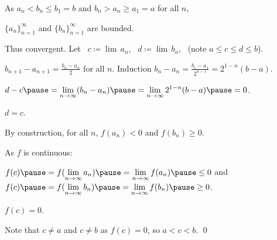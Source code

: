 \documentclass[10pt,aspectratio=149]{beamer}
\begin{document}
\begin{frame}
As $a_n < b_n \leq b_1 = b$ and 
$b_n > a_n \geq a_1 = a$ for all $n$,

\pause
$\{a_n\}_{n=1}^\infty$ and $\{ b_n \}_{n=1}^\infty$ are bounded.

\pause
\medskip

Thus convergent. Let ~$c \coloneqq \lim\, a_n$,~ $d \coloneqq \lim\, b_n$,
~(note $a \leq c \leq d \leq b$).

\pause
\medskip

$b_{n+1} - a_{n+1} = \frac{b_n-a_n}{2}$ for all $n$.
\pause
\qquad 
Induction \wthus
$b_n - a_n
= \frac{b_1-a_1}{2^{n-1}}
= 2^{1-n} (b-a)$.

\pause
\medskip

$\displaystyle
d-c
\pause
= \lim_{n\to\infty} (b_n - a_n)
\pause
=
\lim_{n\to\infty} 2^{1-n} (b-a)
\pause
= 0$.

\pause
\medskip

\thus \quad $d=c$.

\pause
\medskip

By construction, for all $n$, \quad
$f(a_n) < 0$ \quad and \quad $f(b_n) \geq 0$.

\pause
\medskip

As $f$ is continuous:

\medskip

$f(c)
\pause
=
f(\lim\limits_{n\to\infty} a_n)
\pause
=
\lim\limits_{n\to\infty} f(a_n)
\pause
\leq 0$
\pause
\qquad and \qquad
$f(c)
\pause
=
f(\lim\limits_{n\to\infty} b_n)
\pause
=
\lim\limits_{n\to\infty} f(b_n)
\pause
\geq 0$.

\pause
\medskip

\thus \quad $f(c) = 0$.

\pause
\medskip

Note that $c \not=a$ and $c \not= b$ as $f(c)=0$, \quad so $a < c < b$.  \qed
\end{frame}
\end{document}

